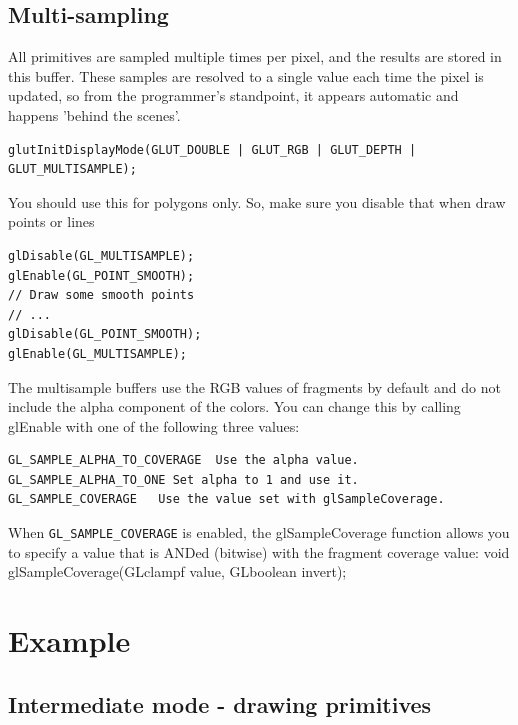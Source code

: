 \subsection{Multi-sampling}
\label{sec:multi-sampling}

All primitives are sampled multiple times per pixel, and the results
are stored in this buffer. These samples are resolved to a single
value each time the pixel is updated, so from the programmer's
standpoint, it appears automatic and happens 'behind the scenes'.

\begin{verbatim}
glutInitDisplayMode(GLUT_DOUBLE | GLUT_RGB | GLUT_DEPTH | GLUT_MULTISAMPLE);
\end{verbatim}

You should use this for polygons only. So, make sure you disable that
when draw points or lines
\begin{verbatim}
glDisable(GL_MULTISAMPLE);
glEnable(GL_POINT_SMOOTH);
// Draw some smooth points
// ...
glDisable(GL_POINT_SMOOTH);
glEnable(GL_MULTISAMPLE);
\end{verbatim}


The multisample buffers use the RGB values of fragments by default and
do not include the alpha component of the colors. You can change this
by calling glEnable with one of the following three values:
\begin{verbatim}
GL_SAMPLE_ALPHA_TO_COVERAGE  Use the alpha value.
GL_SAMPLE_ALPHA_TO_ONE Set alpha to 1 and use it.
GL_SAMPLE_COVERAGE   Use the value set with glSampleCoverage.
\end{verbatim}
When \verb!GL_SAMPLE_COVERAGE! is enabled, the glSampleCoverage
function allows you to specify a value that is ANDed (bitwise) with
the fragment coverage value: void glSampleCoverage(GLclampf value,
GLboolean invert);



\section{Example}
\label{sec:example-1}




\subsection{Intermediate mode - drawing primitives}
\label{sec:intermediate-mode}

